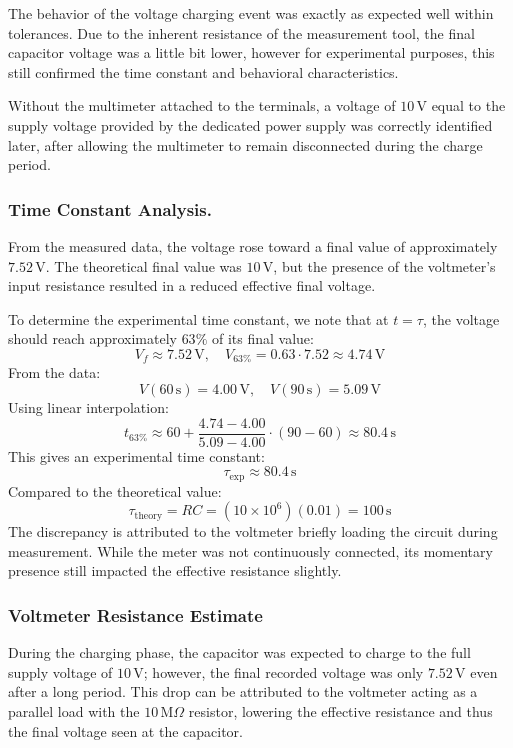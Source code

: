 \documentclass[12pt]{article}
\begin{document}
The behavior of the voltage charging event was exactly as expected well within
tolerances. Due to the inherent resistance of the measurement tool, the final
capacitor voltage was a little bit lower, however for experimental purposes,
this still confirmed the time constant and behavioral characteristics.

Without the multimeter attached to the terminals, a voltage of $10\,\mathrm{V}$
equal to the supply voltage provided by the dedicated power supply was correctly
identified later, after allowing the multimeter to remain disconnected during the
charge period.

\subsubsection{Time Constant Analysis.}

From the measured data, the voltage rose toward a final value of approximately
$7.52\,\mathrm{V}$. The theoretical final value was $10\,\mathrm{V}$, but the
presence of the voltmeter's input resistance resulted in a reduced effective
final voltage.

To determine the experimental time constant, we note that at $t = \tau$, the
voltage should reach approximately $63\%$ of its final value:
\[
	V_f \approx 7.52\,\mathrm{V}, \quad V_{63\%} = 0.63 \cdot 7.52 \approx 4.74\,\mathrm{V}
\]
From the data:
\[
	V(60\,\mathrm{s}) = 4.00\,\mathrm{V}, \quad V(90\,\mathrm{s}) = 5.09\,\mathrm{V}
\]
Using linear interpolation:
\[
	t_{63\%} \approx 60 + \frac{4.74 - 4.00}{5.09 - 4.00} \cdot (90 - 60) \approx 80.4\,\mathrm{s}
\]
This gives an experimental time constant:
\[
	\tau_{\text{exp}} \approx 80.4\,\mathrm{s}
\]
Compared to the theoretical value:
\[
	\tau_{\text{theory}} = RC = (10 \times 10^6)(0.01) = 100\,\mathrm{s}
\]
The discrepancy is attributed to the voltmeter briefly loading the circuit during
measurement. While the meter was not continuously connected, its momentary
presence still impacted the effective resistance slightly.
\subsubsection{Voltmeter Resistance Estimate}
During the charging phase, the capacitor was expected to charge to the full
supply voltage of $10\,\mathrm{V}$; however, the final recorded voltage was only
$7.52\,\mathrm{V}$ even after a long period. This drop can be attributed to the
voltmeter acting as a parallel load with the $10\,\mathrm{M}\Omega$ resistor,
lowering the effective resistance and thus the final voltage seen at the
capacitor.
\end{document}
